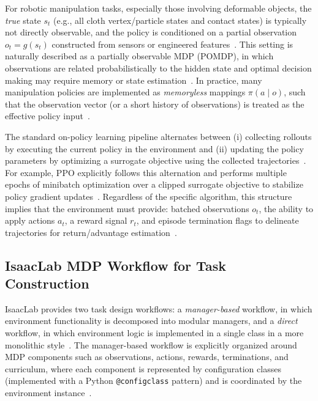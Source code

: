 For robotic manipulation tasks, especially those involving deformable objects, the \emph{true} state $s_t$ (e.g., all cloth vertex/particle states and contact states) is typically not directly observable, and the policy is conditioned on a partial observation $o_t = g(s_t)$ constructed from sensors or engineered features~\cite{Lin2021SoftGym,Kadi2023ClothLikeReview}. This setting is naturally described as a partially observable \ac{MDP} (\ac{POMDP}), in which observations are related probabilistically to the hidden state and optimal decision making may require memory or state estimation~\cite{Spaan2012POMDP}. In practice, many manipulation policies are implemented as \emph{memoryless} mappings $\pi(a \mid o)$, such that the observation vector (or a short history of observations) is treated as the effective policy input~\cite{SuttonBarto2018,Lin2021SoftGym}.

The standard on-policy learning pipeline alternates between (i) collecting rollouts by executing the current policy in the environment and (ii) updating the policy parameters by optimizing a surrogate objective using the collected trajectories~\cite{Schulman2017PPO}. For example, \ac{PPO} explicitly follows this alternation and performs multiple epochs of minibatch optimization over a clipped surrogate objective to stabilize policy gradient updates~\cite{Schulman2017PPO}. Regardless of the specific algorithm, this structure implies that the environment must provide: batched observations $o_t$, the ability to apply actions $a_t$, a reward signal $r_t$, and episode termination flags to delineate trajectories for return/advantage estimation~\cite{SuttonBarto2018,Schulman2017PPO}.

\subsection{IsaacLab MDP Workflow for Task Construction}

IsaacLab provides two task design workflows: a \emph{manager-based} workflow, in which environment functionality is decomposed into modular managers, and a \emph{direct} workflow, in which environment logic is implemented in a single class in a more monolithic style~\cite{isaaclab_task_design_workflows,nvidia_isaaclab_mdp_managers_getting_started}. The manager-based workflow is explicitly organized around \ac{MDP} components such as observations, actions, rewards, terminations, and curriculum, where each component is represented by configuration classes (implemented with a Python \texttt{@configclass} pattern) and is coordinated by the environment instance~\cite{nvidia_isaaclab_mdp_managers_getting_started,isaaclab_task_design_workflows,isaaclab_mdp_terms_api}.

